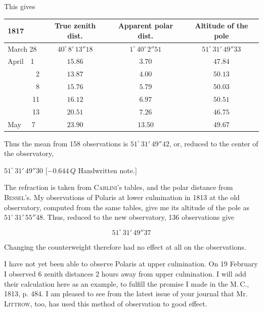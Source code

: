 \par\indent This gives

\begin{center}
\fontsize{9}{11}\selectfont
\setlength{\tabcolsep}{3pt}
\begin{tabular}{l|c|c|c}
1817 & True zenith dist. & Apparent polar dist. & Altitude of the pole \\
\hline
March 28 & $40^\circ\,8'\,13''18$ & $1^\circ\,40'\,2''51$ & $51^\circ\,31'\,49''33$ \\
April\ \ 1 & $15.86$ & $3.70$ & $47.84$ \\
\ \ \ \ \ \ \ \ 2 & $13.87$ & $4.00$ & $50.13$ \\
\ \ \ \ \ \ \ \ 8 & $15.76$ & $5.79$ & $50.03$ \\
\ \ \ \ \ \ \ 11 & $16.12$ & $6.97$ & $50.51$ \\
\ \ \ \ \ \ \ 13 & $20.51$ & $7.26$ & $46.75$ \\
May\ \ \ 7 & $23.90$ & $13.50$ & $49.67$ \\
\end{tabular}
\end{center}

\par\indent Thus the mean from 158 observations is $51^\circ\,31'\,49''42$, or, reduced to the center of the observatory,

\begin{center}\fontsize{10}{12}\selectfont $51^\circ\,31'\,49''30$ [$-0.644\,Q$ Handwritten note.]\end{center}

\par\indent The refraction is taken from \textsc{Carlini}’s tables, and the polar distance from \textsc{Bessel}’s. My observations of Polaris at lower culmination in 1813 at the old observatory, computed from the same tables, give me its altitude of the pole as $51^\circ\,31'\,55''48$. Thus, reduced to the new observatory, 136 observations give

\[ 51^\circ\,31'\,49''37 \]

\par\indent Changing the counterweight therefore had no effect at all on the observations.

\par\indent I have not yet been able to observe Polaris at upper culmination. On 19 February I observed 6 zenith distances 2 hours away from upper culmination. I will add their calculation here as an example, to fulfill the promise I made in the M.\,C., 1813, p. 484. I am pleased to see from the latest issue of your journal that Mr. \textsc{Littrow}, too, has used this method of observation to good effect.

